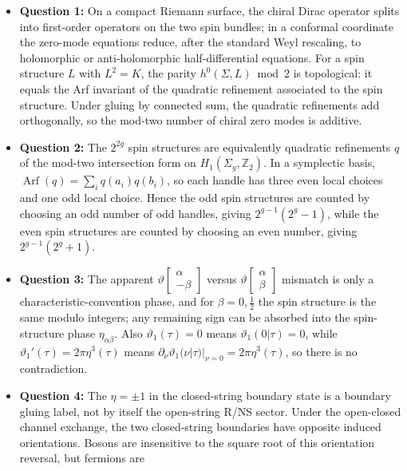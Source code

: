 \documentclass[
  10pt,
  a4paper,
  openany]{book}
\providecommand{\tightlist}{%
  \setlength{\itemsep}{0pt}\setlength{\parskip}{0pt}}
\begin{document}
\begin{itemize}
\tightlist
\item
  \textbf{Question 1:} On a compact Riemann surface, the chiral Dirac
  operator splits into first-order operators on the two spin bundles; in
  a conformal coordinate the zero-mode equations reduce, after the
  standard Weyl rescaling, to holomorphic or anti-holomorphic
  half-differential equations. For a spin structure \(L\) with
  \(L^2=K\), the parity \(h^0(\Sigma,L)\bmod 2\) is topological: it
  equals the Arf invariant of the quadratic refinement associated to the
  spin structure. Under gluing by connected sum, the quadratic
  refinements add orthogonally, so the mod-two number of chiral zero
  modes is additive.
\item
  \textbf{Question 2:} The \(2^{2g}\) spin structures are equivalently
  quadratic refinements \(q\) of the mod-two intersection form on
  \(H_1(\Sigma_g,\mathbb Z_2)\). In a symplectic basis,
  \(\operatorname{Arf}(q)=\sum_i q(a_i)q(b_i)\), so each handle has
  three even local choices and one odd local choice. Hence the odd spin
  structures are counted by choosing an odd number of odd handles,
  giving \(2^{g-1}(2^g-1)\), while the even spin structures are counted
  by choosing an even number, giving \(2^{g-1}(2^g+1)\).
\item
  \textbf{Question 3:} The apparent
  \(\vartheta\begin{bmatrix}\alpha\\-\beta\end{bmatrix}\) versus
  \(\vartheta\begin{bmatrix}\alpha\\\beta\end{bmatrix}\) mismatch is
  only a characteristic-convention phase, and for
  \(\beta=0,\frac{1}{2}\) the spin structure is the same modulo
  integers; any remaining sign can be absorbed into the spin-structure
  phase \(\eta_{\alpha\beta}\). Also \(\vartheta_1(\tau)=0\) means
  \(\vartheta_1(0|\tau)=0\), while
  \(\vartheta_1'(\tau)=2\pi\eta^3(\tau)\) means
  \(\partial_\nu\vartheta_1(\nu|\tau)|_{\nu=0}=2\pi\eta^3(\tau)\), so
  there is no contradiction.
\item
  \textbf{Question 4:} The \(\eta=\pm 1\) in the closed-string boundary
  state is a boundary gluing label, not by itself the open-string R/NS
  sector. Under the open-closed channel exchange, the two closed-string
  boundaries have opposite induced orientations. Bosons are insensitive
  to the square root of this orientation reversal, but fermions are

\end{itemize}
\end{document}
